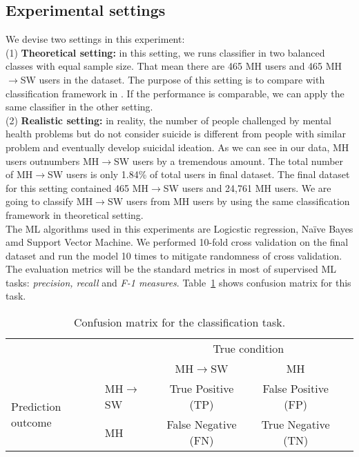\subsection{Experimental settings}
We devise two settings in this experiment:\\
(1) \textbf{Theoretical setting:} in this setting, we runs classifier in two balanced classes with equal sample size. That mean there are 465 MH users and 465 MH$\rightarrow$SW users in the dataset. The purpose of this setting is to compare with classification framework in \cite{DeChoudhury2016}. If the performance is comparable, we can apply the same classifier in the other setting.\\
(2) \textbf{Realistic setting:} in reality, the number of people challenged by mental health problems but do not consider suicide is different from people with similar problem and eventually develop suicidal ideation. As we can see in our data, MH users outnumbers MH$\rightarrow$SW users by a tremendous amount. The total number of MH$\rightarrow$SW users is only 1.84\% of total users in final dataset. The final dataset for this setting contained 465 MH$\rightarrow$SW users and 24,761 MH users. We are going to classify MH$\rightarrow$SW users from MH users by using the same classification framework in theoretical setting.\\
The ML algorithms used in this experiments are Logicstic regression, Na\"ive Bayes amd Support Vector Machine. We performed 10-fold cross validation on the final dataset and run the model 10 times to mitigate randomness of cross validation. The evaluation metrics will be the standard metrics in most of supervised ML tasks: \textit{precision, recall} and \textit{F-1 measures}. Table~\ref{tab:confusion_matrix} shows confusion matrix for this task.\\
\begin{table}
\begin{tabular}{l|l|c|c|c}
\multicolumn{2}{c}{}&\multicolumn{2}{c}{True condition}&\\
\cline{3-4}
\multicolumn{2}{c|}{} & MH$\rightarrow$SW &  MH \\
\cline{2-4}
\multirow{2}{*}{Prediction outcome} & MH$\rightarrow$SW & True Positive (TP) &  False Positive (FP) \\
\cline{2-4}
& MH & False Negative (FN) & True Negative (TN) \\
\cline{2-4}
\end{tabular}
\caption{Confusion matrix for the classification task.}
\label{tab:confusion_matrix}
\end{table}
